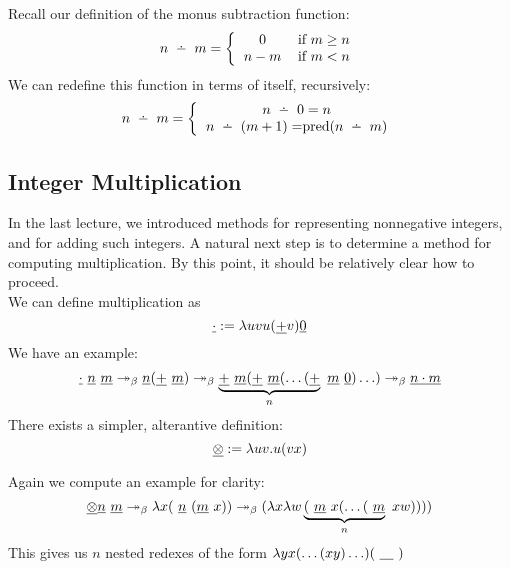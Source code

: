 Recall our definition of the monus subtraction function:
\begin{equation*}
  n \monus m = \left\{\begin{tabular}{cl}0 & if $m \geq n$\\ $n - m$ & if $m < n$\end{tabular}\right.
\end{equation*}
We can redefine this function in terms of itself, recursively:
\begin{equation*}
  n \monus m = \left\{
  \begin{tabular}{cl}
    $n \monus 0 = n$\\
    $n \monus (m + 1) = $pred$(n \monus m)$\\
  \end{tabular}
  \right.
\end{equation*}


\subsection{Integer Multiplication}
In the last lecture, we introduced methods for representing nonnegative integers, and for adding such integers. A natural next step is to determine a method for computing multiplication. By this point, it should be relatively clear how to proceed.\\

We can define multiplication as
\begin{equation*}
  \uline{\cdot} := \l uv u(\uline{+}v)\uline{0}
\end{equation*}
We have an example:
\begin{equation*}
  \uline{\cdot}\ \uline{n}\ \uline{m} \twoheadrightarrow_{\beta} \uline{n}(\uline{+}\ \uline{m}) \twoheadrightarrow_{\beta} \underbrace{\uline{+}\ \uline{m} (\uline{+}\ \uline{m} ( \ldots (\uline{+}}_{n}\ \uline{m}\ \uline{0}) \ldots ) \twoheadrightarrow_{\beta} \uline{n \cdot m}
\end{equation*}
There exists a simpler, alterantive definition:
\begin{equation*}
  \uline{\otimes} := \l uv . u(vx)
\end{equation*}

Again we compute an example for clarity:
\begin{equation*}
  \uline{\otimes} \uline{n}\ \uline{m} \twoheadrightarrow_{\beta} \l x (\ \uline{n}\ (\uline{m}\ x)) \twoheadrightarrow_{\beta} (\l x \l w \underbrace{(\ \uline{m}\ x(\ldots (\ \uline{m}}_{n}\ x w))))
\end{equation*}
This gives us $n$ nested redexes of the form $\l yx(\ldots(xy)\ldots)(\ \uline{\ \ \ }\ )$

